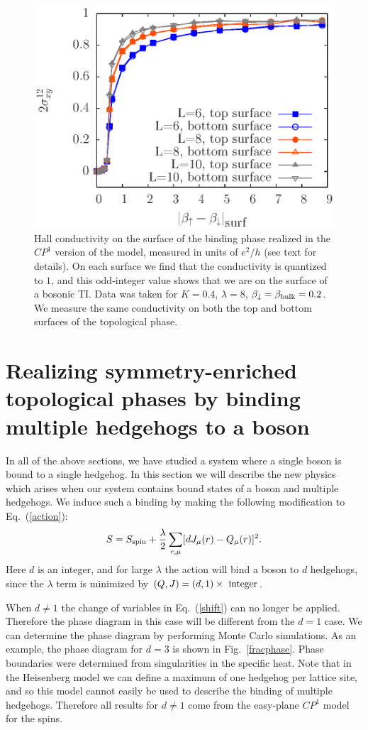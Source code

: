 \begin{figure}
\includegraphics[width=0.6\linewidth]{figures/cp1hall.eps}
\caption{Hall conductivity on the surface of the binding phase realized in the $CP^1$ version of the model, measured in units of $e^2/h$ (see text for details). On each surface we find that the conductivity is quantized to $1$, and this odd-integer value shows that we are on the surface of a bosonic TI. Data was taken for $K=0.4$, $\lambda=8$, $\beta_\downarrow=\beta_{\rm bulk}=0.2$. We measure the same conductivity on both the top and bottom surfaces of the topological phase.
}
\label{cp1hall}
\end{figure}


\section{Realizing symmetry-enriched topological phases by binding multiple hedgehogs to a boson}
\label{section::multiple}

In all of the above sections, we have studied a system where a single boson is bound to a single hedgehog. In this section we will describe the new physics which arises when our system contains bound states of a boson and multiple hedgehogs. We induce such a binding by making the following modification to Eq.~(\ref{action}):
\begin{equation}
S=S_{\rm spin}+\frac{\lambda}{2}\sum_{r,\mu} [ dJ_\mu(r)- Q_\mu(r)]^2.
\label{cdbind}
\end{equation}
Here $d$ is an integer, and for large $\lambda$ the action will bind a boson to $d$ hedgehogs, since the $\lambda$ term is minimized by $(Q, J) = (d, 1) \times~{\rm integer}$. 

When $d\neq1$ the change of variables in Eq.~(\ref{shift}) can no longer be applied. Therefore the phase diagram in this case will be different from the $d=1$ case. We can determine the phase diagram by performing Monte Carlo simulations. As an example, the phase diagram for $d=3$ is shown in Fig.~\ref{fracphase}. Phase boundaries were determined from singularities in the specific heat. Note that in the Heisenberg model we can define a maximum of one hedgehog per lattice site, and so this model cannot easily be used to describe the binding of  multiple hedgehogs. Therefore all results for $d \neq 1$ come from the easy-plane $CP^1$ model for the spins. 

